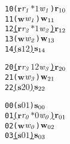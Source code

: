 \newsavebox{\boxtwo}
\begin{lrbox}{\boxtwo}
\begin{minipage}[t]{0.65\linewidth}
\large
\begin{alltt}
10 (\(\mathbf{r}\) \(\mathit{r\sb{1}}\) \(\mathit{\ast 1}\) \(\mathit{w\sb{1}}\)) \(\mathbf{r}\sb{10}\)
11 (\(\mathbf{w}\) \(\mathit{w\sb{1}}\)) \(\mathbf{w}\sb{11}\)
12 \underline{(\(\mathbf{r}\) \(\mathit{r\sb{2}}\) \(\mathit{\ast 1}\) \(\mathit{w\sb{2}}\)) \(\mathbf{r}\sb{12}\)}
13 (\(\mathbf{w}\) \(\mathit{w\sb{2}}\)) \(\mathbf{w}\sb{13}\)
14 \underline{(\(\mathbf{s}\) \(\mathit{1 2}\)) \(\mathbf{s}\sb{14}\)}
\end{alltt}
\end{minipage}
\end{lrbox}

\newsavebox{\boxthree}
\begin{lrbox}{\boxthree}
\begin{minipage}[t]{0.65\linewidth}
\large
\begin{alltt}
20 \underline{(\(\mathbf{r}\) \(\mathit{r\sb{3}}\) \(\mathit{1 2}\) \(\mathit{w\sb{3}}\)) \(\mathbf{r}\sb{20}\)}
21 (\(\mathbf{w}\) \(\mathit{w\sb{3}}\)) \(\mathbf{w}\sb{21}\)
22 \underline{(\(\mathbf{s}\) \(\mathit{2 0}\)) \(\mathbf{s}\sb{22}\)}
\end{alltt}
\end{minipage}
\end{lrbox}


\newcommand\examplefigthree{
\begin{figure*}[tb]
\begin{center}
\setlength{\tabcolsep}{2pt}
\begin{tabular}[t]{c|c|c}
$p_0$ & $p_1$ & $p_2$ \\
\hline
\scalebox{0.8}{\usebox{\boxone}}&
\scalebox{0.8}{\usebox{\boxtwo}} &
\scalebox{0.8}{\usebox{\boxthree}}\\
\end{tabular}
\end{center}
\caption{A Deadlock Caused by Circular Dependency in Messages}
\label{fig:deadlock2}
\end{figure*}
}


\newsavebox{\boxoneno}
\begin{lrbox}{\boxoneno}
\begin{minipage}[t]{0.65\linewidth}
\large
\begin{alltt}
00 (\(\mathbf{s}\) \(\mathit{0 1}\)) \(\mathbf{s}\sb{00}\)
01 \underline{(\(\mathbf{r}\) \(\mathit{r\sb{0}}\) \(\mathit{\ast 0}\) \(\mathit{w\sb{0}}\)) \(\mathbf{r}\sb{01}\)}
02 (\(\mathbf{w}\) \(\mathit{w\sb{0}}\)) \(\mathbf{w}\sb{02}\)
03 \underline{(\(\mathbf{s}\) \(\mathit{0 1}\)) \(\mathbf{s}\sb{03}\)}
\end{alltt}
\end{minipage}
\end{lrbox}

